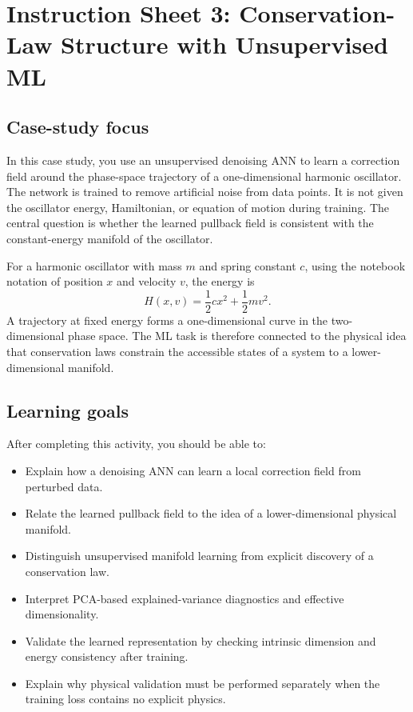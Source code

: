 \section*{Instruction Sheet 3: Conservation-Law Structure with Unsupervised ML}

\subsection*{Case-study focus}
In this case study, you use an unsupervised denoising ANN to learn a correction field around the phase-space trajectory of a one-dimensional harmonic oscillator. The network is trained to remove artificial noise from data points. It is not given the oscillator energy, Hamiltonian, or equation of motion during training. The central question is whether the learned pullback field is consistent with the constant-energy manifold of the oscillator.

For a harmonic oscillator with mass \(m\) and spring constant \(c\), using the notebook notation of position \(x\) and velocity \(v\), the energy is
\[
H(x,v)=\frac{1}{2}cx^2+\frac{1}{2}mv^2.
\]
A trajectory at fixed energy forms a one-dimensional curve in the two-dimensional phase space. The ML task is therefore connected to the physical idea that conservation laws constrain the accessible states of a system to a lower-dimensional manifold.

\subsection*{Learning goals}
After completing this activity, you should be able to:
\begin{itemize}
    \item Explain how a denoising ANN can learn a local correction field from perturbed data.
    \item Relate the learned pullback field to the idea of a lower-dimensional physical manifold.
    \item Distinguish unsupervised manifold learning from explicit discovery of a conservation law.
    \item Interpret PCA-based explained-variance diagnostics and effective dimensionality.
    \item Validate the learned representation by checking intrinsic dimension and energy consistency after training.
    \item Explain why physical validation must be performed separately when the training loss contains no explicit physics.
\end{itemize}

